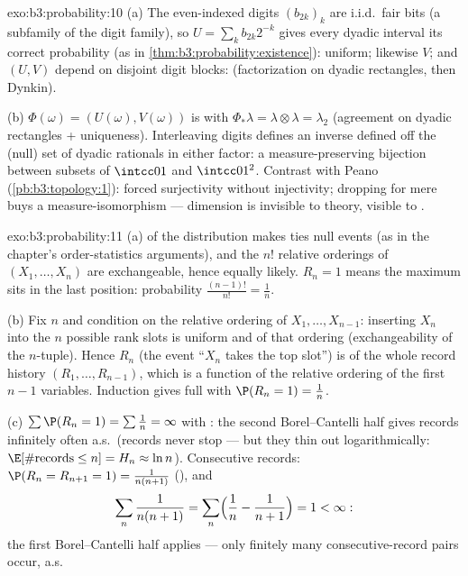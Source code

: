 \begin{solution}{exo:b3:probability:10}
(a) The even-indexed digits $(b_{2k})_k$ are i.i.d.\ fair
bits (a subfamily of the  digit family), so $U =
\sum_kb_{2k}2^{-k}$ gives every dyadic interval its correct
probability (as in
\cref{thm:b3:probability:existence}): uniform; likewise $V$;
and $(U, V)$ depend on disjoint digit blocks: 
(factorization on dyadic rectangles, then Dynkin).

(b) $\Phi(\omega) = (U(\omega), V(\omega))$ is 
with $\Phi_*\lambda = \lambda\otimes\lambda = \lambda_2$
(agreement on dyadic rectangles + uniqueness). Interleaving
digits defines an inverse defined off the (null) set of
dyadic rationals in either factor: a measure-preserving
bijection between  subsets of $\intcc01$ and
$\intcc01^2$. Contrast with Peano
(\cref{pb:b3:topology:1}):  forced surjectivity
without injectivity; dropping  for mere
 buys a measure-isomorphism --- dimension is
invisible to  theory, visible to .
\end{solution}

\begin{solution}{exo:b3:probability:11}
(a)  of the distribution makes ties null events
(as in the chapter's order-statistics arguments), and the
$n!$ relative orderings of $(X_1, \dots, X_n)$ are
exchangeable, hence equally likely. $R_n = 1$ means the
maximum sits in the last position: probability
$\frac{(n-1)!}{n!} = \frac1n$.

(b) Fix $n$ and condition on the relative ordering of $X_1,
\dots, X_{n-1}$: inserting $X_n$ into the $n$ possible rank
slots is uniform and  of that ordering
(exchangeability of the $n$-tuple). Hence $R_n$ (the event
``$X_n$ takes the top slot'') is  of the whole
record history $(R_1, \dots, R_{n-1})$, which is a function
of the relative ordering of the first $n - 1$ variables.
Induction gives full  with $\P(R_n = 1) =
\frac1n$.

(c) $\sum\P(R_n = 1) = \sum\frac1n = \infty$ with
: the second Borel--Cantelli half gives records
infinitely often a.s.\ (records never stop --- but they
thin out logarithmically: $\E[\#\text{records} \leq n] =
H_n \approx \ln n$). Consecutive records: $\P(R_n = R_{n+1}
= 1) = \frac1{n(n+1)}$ (), and
\[
\sum_n\frac1{n(n+1)} = \sum_n\Bigl(\frac1n -
\frac1{n+1}\Bigr) = 1 < \infty :
\]
the first Borel--Cantelli half applies --- only finitely
many consecutive-record pairs occur, a.s.
\end{solution}


